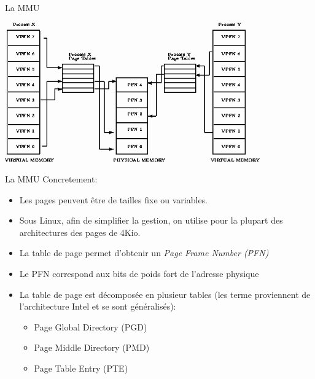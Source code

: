 \begin{frame}{La MMU}
  \begin{center}
    \includegraphics[height=6cm]{pics/img9}
  \end{center}
\end{frame}

\begin{frame}{La MMU}
Concretement:
  \begin{itemize}
    \item Les pages peuvent être de tailles fixe ou variables.
    \item Sous Linux,  afin de simplifier la gestion,  on utilise pour
      la plupart des architectures des pages de 4Kio.
    \item La table de page permet d'obtenir un \emph{Page Frame Number (PFN)}
    \item Le PFN correspond aux bits de poids fort de l'adresse physique
    \item  La table  de page  est décomposée  en plusieur  tables (les
      terme   proviennent   de  l'architecture   Intel   et  se   sont
      généralisés):
      \begin{itemize}
      \item Page Global Directory (PGD)
      \item Page Middle Directory (PMD)
      \item Page Table Entry (PTE)
      \end{itemize}
    \end{itemize}
\end{frame}

